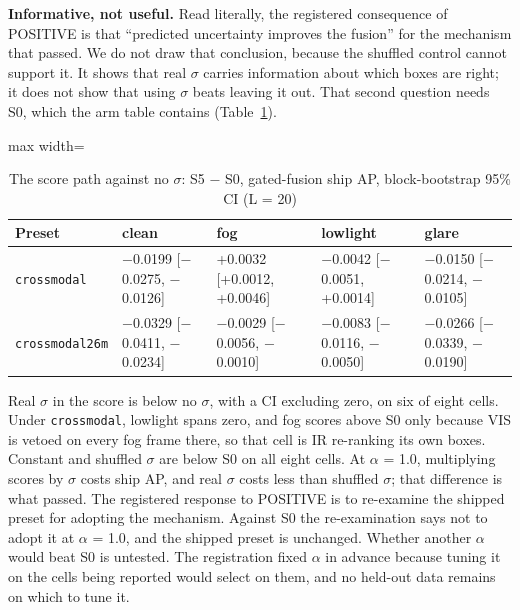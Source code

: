 \documentclass[journal,onecolumn]{IEEEtran}
\begin{document}
\textbf{Informative, not useful.} Read literally, the registered consequence of POSITIVE is that ``predicted uncertainty improves the fusion'' for the mechanism that passed. We do not draw that conclusion, because the shuffled control cannot support it. It shows that real $\sigma$ carries information about which boxes are right; it does not show that using $\sigma$ beats leaving it out. That second question needs S0, which the arm table contains (Table~\ref{tab:11}).

\begin{table}[htbp]
\centering
\footnotesize
\caption{The score path against no $\sigma$: S5 $-$ S0, gated-fusion ship AP, block-bootstrap 95\% CI (L = 20)}
\label{tab:11}
\begin{adjustbox}{max width=\linewidth}
\begin{tabular}{lllll}
\toprule
Preset & clean & fog & lowlight & glare \\
\midrule
\texttt{crossmodal} & $-$0.0199 [$-$0.0275, $-$0.0126] & +0.0032 [+0.0012, +0.0046] & $-$0.0042 [$-$0.0051, +0.0014] & $-$0.0150 [$-$0.0214, $-$0.0105] \\
\texttt{crossmodal26m} & $-$0.0329 [$-$0.0411, $-$0.0234] & $-$0.0029 [$-$0.0056, $-$0.0010] & $-$0.0083 [$-$0.0116, $-$0.0050] & $-$0.0266 [$-$0.0339, $-$0.0190] \\
\bottomrule
\end{tabular}
\end{adjustbox}
\end{table}
Real $\sigma$ in the score is below no $\sigma$, with a CI excluding zero, on six of eight cells. Under \texttt{crossmodal}, lowlight spans zero, and fog scores above S0 only because VIS is vetoed on every fog frame there, so that cell is IR re-ranking its own boxes. Constant and shuffled $\sigma$ are below S0 on all eight cells. At $\alpha$ = 1.0, multiplying scores by $\sigma$ costs ship AP, and real $\sigma$ costs less than shuffled $\sigma$; that difference is what passed. The registered response to POSITIVE is to re-examine the shipped preset for adopting the mechanism. Against S0 the re-examination says not to adopt it at $\alpha$ = 1.0, and the shipped preset is unchanged. Whether another $\alpha$ would beat S0 is untested. The registration fixed $\alpha$ in advance because tuning it on the cells being reported would select on them, and no held-out data remains on which to tune it.
\end{document}
